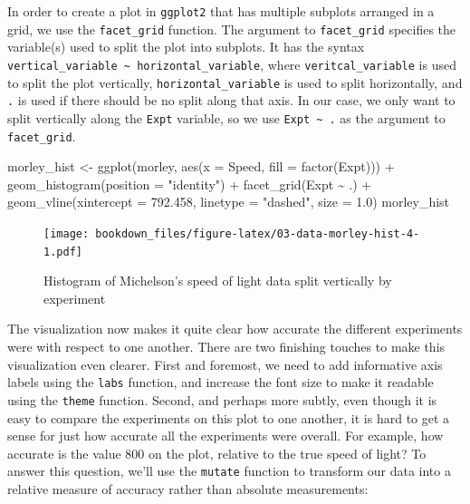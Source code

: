 \documentclass[
]{krantz}
\makeatletter
\newenvironment{Shaded}{\begin{snugshade}}{\end{snugshade}}
\newcommand{\AttributeTok}[1]{\textcolor[rgb]{0.61,0.61,0.61}{#1}}
\newcommand{\FloatTok}[1]{\textcolor[rgb]{0.06,0.06,0.06}{#1}}
\newcommand{\FunctionTok}[1]{\textcolor[rgb]{0,0,0}{#1}}
\newcommand{\NormalTok}[1]{#1}
\newcommand{\OtherTok}[1]{\textcolor[rgb]{0.37,0.37,0.37}{#1}}
\newcommand{\SpecialCharTok}[1]{\textcolor[rgb]{0,0,0}{#1}}
\newcommand{\StringTok}[1]{\textcolor[rgb]{0.5,0.5,0.5}{#1}}
\newenvironment{kframe}{%
\medskip{}
\setlength{\fboxsep}{.8em}
 \def\at@end@of@kframe{}%
 \ifinner\ifhmode%
  \def\at@end@of@kframe{\end{minipage}}%
  \begin{minipage}{\columnwidth}%
 \fi\fi%
 \def\FrameCommand##1{\hskip\@totalleftmargin \hskip-\fboxsep
 \colorbox{shadecolor}{##1}\hskip-\fboxsep
     \hskip-\linewidth \hskip-\@totalleftmargin \hskip\columnwidth}%
 \MakeFramed {\advance\hsize-\width
   \@totalleftmargin\z@ \linewidth\hsize
   \@setminipage}}%
 {\par\unskip\endMakeFramed%
 \at@end@of@kframe}
\renewenvironment{Shaded}{\begin{kframe}}{\end{kframe}}
\makeatother
\begin{document}
In order to create a plot in \texttt{ggplot2} that has multiple subplots arranged in a grid, we use the \texttt{facet\_grid} function.
The argument to \texttt{facet\_grid} specifies the variable(s) used to split the plot into subplots. It has the syntax \texttt{vertical\_variable\ \textasciitilde{}\ horizontal\_variable},
where \texttt{veritcal\_variable} is used to split the plot vertically, \texttt{horizontal\_variable} is used to split horizontally, and \texttt{.} is used if there should be no split
along that axis. In our case, we only want to split vertically along the \texttt{Expt} variable, so we use \texttt{Expt\ \textasciitilde{}\ .} as the argument to \texttt{facet\_grid}.

\begin{Shaded}
\begin{Highlighting}[]
\NormalTok{morley\_hist }\OtherTok{\textless{}{-}} \FunctionTok{ggplot}\NormalTok{(morley, }\FunctionTok{aes}\NormalTok{(}\AttributeTok{x =}\NormalTok{ Speed, }\AttributeTok{fill =} \FunctionTok{factor}\NormalTok{(Expt))) }\SpecialCharTok{+}
  \FunctionTok{geom\_histogram}\NormalTok{(}\AttributeTok{position =} \StringTok{"identity"}\NormalTok{) }\SpecialCharTok{+}
  \FunctionTok{facet\_grid}\NormalTok{(Expt }\SpecialCharTok{\textasciitilde{}}\NormalTok{ .) }\SpecialCharTok{+}
  \FunctionTok{geom\_vline}\NormalTok{(}\AttributeTok{xintercept =} \FloatTok{792.458}\NormalTok{, }\AttributeTok{linetype =} \StringTok{"dashed"}\NormalTok{, }\AttributeTok{size =} \FloatTok{1.0}\NormalTok{)}
\NormalTok{morley\_hist}
\end{Highlighting}
\end{Shaded}

\begin{figure}
\centering
\texttt{[image: bookdown\_files/figure-latex/03-data-morley-hist-4-1.pdf]}
\caption{\label{fig:03-data-morley-hist-4}Histogram of Michelson's speed of light data split vertically by experiment}
\end{figure}

The visualization now makes it quite clear how accurate the different experiments were with respect to one another.
There are two finishing touches to make this visualization even clearer. First and foremost, we need to add informative axis labels
using the \texttt{labs} function, and increase the font size to make it readable using the \texttt{theme} function. Second, and perhaps more subtly, even though it
is easy to compare the experiments on this plot to one another, it is hard to get a sense
for just how accurate all the experiments were overall. For example, how accurate is the value 800 on the plot, relative to the true speed of light?
To answer this question, we'll use the \texttt{mutate} function to transform our data into a relative measure of accuracy rather than absolute measurements:
\end{document}
